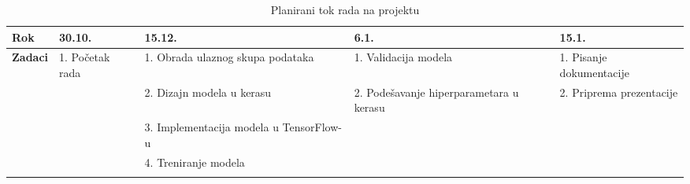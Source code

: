 \documentclass{report}
\begin{document}
\begin{longtable}{|p{35pt}|p{90pt}|p{90pt}|p{90pt}|p{90pt}|}
\hline
\textbf{Rok} & \textbf{30.10.} & \textbf{15.12.} & \textbf{6.1.} & \textbf{15.1.} \\
\hline
\multirow{5}{*}{\textbf{Zadaci}} 
                   & 1. Početak rada & 1. Obrada ulaznog skupa podataka & 1. Validacija modela & 1. Pisanje dokumentacije \\
                   & & 2. Dizajn modela u kerasu & 2. Podešavanje hiperparametara u kerasu & 2. Priprema prezentacije \\
                   & & 3. Implementacija modela u TensorFlow-u & & \\
                   & & 4. Treniranje modela & & \\
\hline

\caption{Planirani tok rada na projektu}

\end{longtable}
\end{document}
